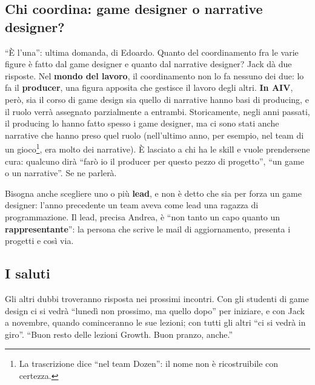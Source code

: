 \subsection{Chi coordina: game designer o narrative designer?}

``È l'una'': ultima domanda, di Edoardo. Quanto del coordinamento fra le
varie figure è fatto dal game designer e quanto dal narrative designer?
Jack dà due risposte. Nel \textbf{mondo del lavoro}, il coordinamento non lo
fa nessuno dei due: lo fa il \textbf{producer}, una figura apposita che
gestisce il lavoro degli altri. \textbf{In AIV}, però, sia il corso di game
design sia quello di narrative hanno basi di producing, e il ruolo verrà
assegnato parzialmente a entrambi. Storicamente, negli anni passati, il
producing lo hanno fatto spesso i game designer, ma ci sono stati anche
narrative che hanno preso quel ruolo (nell'ultimo anno, per esempio, nel
team di un gioco\footnote{La trascrizione dice ``nel team Dozen'': il nome
non è ricostruibile con certezza.}, era molto dei narrative). È lasciato a
chi ha le skill e vuole prendersene cura: qualcuno dirà ``farò io il producer
per questo pezzo di progetto'', ``un game o un narrative''. Se ne parlerà.

Bisogna anche scegliere uno o più \textbf{lead}, e non è detto che sia per
forza un game designer: l'anno precedente un team aveva come lead una
ragazza di programmazione. Il lead, precisa Andrea, è ``non tanto un capo
quanto un \textbf{rappresentante}'': la persona che scrive le mail di
aggiornamento, presenta i progetti e così via.

\subsection{I saluti}

Gli altri dubbi troveranno risposta nei prossimi incontri. Con gli studenti
di game design ci si vedrà ``lunedì non prossimo, ma quello dopo'' per
iniziare, e con Jack a novembre, quando cominceranno le sue lezioni; con
tutti gli altri ``ci si vedrà in giro''. ``Buon resto delle lezioni Growth.
Buon pranzo, anche.''
